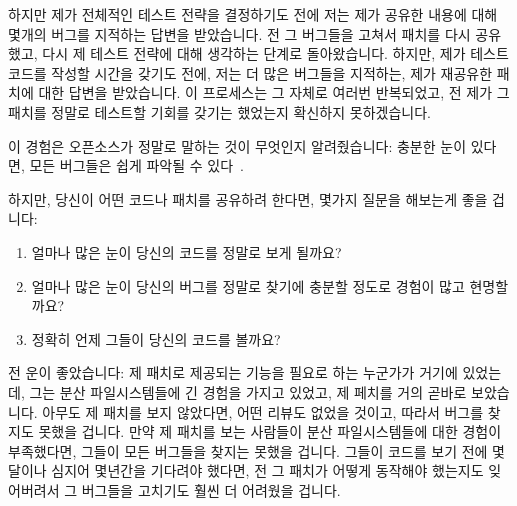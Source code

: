 하지만 제가 전체적인 테스트 전략을 결정하기도 전에 저는 제가 공유한 내용에 대해
몇개의 버그를 지적하는 답변을 받았습니다.
전 그 버그들을 고쳐서 패치를 다시 공유했고, 다시 제 테스트 전략에 대해 생각하는
단계로 돌아왔습니다.
하지만, 제가 테스트 코드를 작성할 시간을 갖기도 전에, 저는 더 많은 버그들을
지적하는, 제가 재공유한 패치에 대한 답변을 받았습니다.
이 프로세스는 그 자체로 여러번 반복되었고, 전 제가 그 패치를 정말로 테스트할
기회를 갖기는 했었는지 확신하지 못하겠습니다.

이 경험은 오픈소스가 정말로 말하는 것이 무엇인지 알려줬습니다:
충분한 눈이 있다면, 모든 버그들은 쉽게 파악될 수 있다~\cite{EricSRaymond99b}.

하지만, 당신이 어떤 코드나 패치를 공유하려 한다면, 몇가지 질문을 해보는게 좋을
겁니다:

\begin{enumerate}
\item	얼마나 많은 눈이 당신의 코드를 정말로 보게 될까요?
\item	얼마나 많은 눈이 당신의 버그를 정말로 찾기에 충분할 정도로 경험이 많고
	현명할까요?
\item	정확히 언제 그들이 당신의 코드를 볼까요?

\end{enumerate}

전 운이 좋았습니다:  제 패치로 제공되는 기능을 필요로 하는 누군가가 거기에
있었는데, 그는 분산 파일시스템들에 긴 경험을 가지고 있었고, 제 페치를 거의
곧바로 보았습니다.
아무도 제 패치를 보지 않았다면, 어떤 리뷰도 없었을 것이고, 따라서 버그를 찾지도
못했을 겁니다.
만약 제 패치를 보는 사람들이 분산 파일시스템들에 대한 경험이 부족했다면, 그들이
모든 버그들을 찾지는 못했을 겁니다.
그들이 코드를 보기 전에 몇달이나 심지어 몇년간을 기다려야 했다면, 전 그 패치가
어떻게 동작해야 했는지도 잊어버려서 그 버그들을 고치기도 훨씬 더 어려웠을
겁니다.
\iffalse

